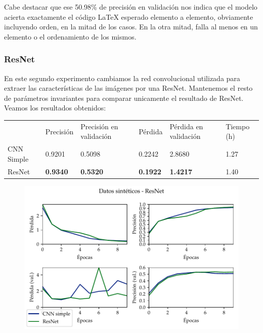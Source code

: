 \documentclass[a4paper, 20pt, dvipsnames]{article}
\begin{document}
Cabe destacar que ese 50.98\% de precisión en validación nos indica que el modelo
acierta exactamente el código \LaTeX{} esperado elemento a elemento, obviamente
incluyendo orden, en la mitad de los casos. En la otra mitad, falla al menos en
un elemento o el ordenamiento de los mismos.


\subsubsection{ResNet}
\label{exp:toy2}

En este segundo experimento cambiamos la red convolucional utilizada para extraer
las características de las imágenes por una ResNet. Mantenemos el resto de parámetros
invariantes para comparar unicamente el resultado de ResNet. Veamos los resultados obtenidos:

\begin{table}[H]
	\centering
	\begin{tabular}{llllll}
		& Precisión       & Precisión en validación & Pérdida         & Pérdida en validación & Tiempo (h) \\ \cline{2-6} 
		CNN Simple & 0.9201          & 0.5098                  & 0.2242          & 2.8680                & 1.27       \\
		ResNet     & \textbf{0.9340} & \textbf{0.5320}         & \textbf{0.1922} & \textbf{1.4217}       & 1.40      
	\end{tabular}
\end{table}

\begin{figure}[H]
	\centering
	\includegraphics{fig/toy-2.pdf}
\end{figure}
\end{document}
